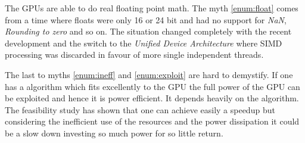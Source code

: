 The \glspl{GPU} are able to do real floating point math. The myth
\autoref{enum:float} comes from a time where floats were only 16 or 24 bit and
had no support for \emph{NaN}, \emph{Rounding to zero} and so on. The situation
changed completely with the recent development and the switch to the
\emph{Unified Device Architecture} where \gls{SIMD} processing was discarded in
favour of more single independent threads.

The last to myths \autoref{enum:ineff} and \autoref{enum:exploit} are hard to
demystify. If one has a algorithm which fits excellently to the \gls{GPU} the
full power of the \gls{GPU} can be exploited and hence it is power efficient. It
depends heavily on the algorithm. The feasibility study has shown that one can
achieve easily a speedup but considering the inefficient use of the resources
and the power dissipation it could be a slow down investing so much power for so
little return.








